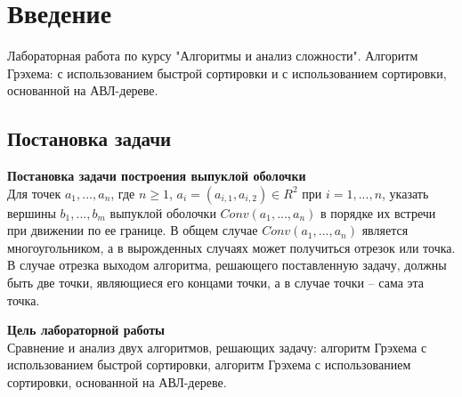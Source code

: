 \section{Введение}
Лабораторная работа по курсу "Алгоритмы и анализ сложности". Алгоритм Грэхема: с использованием быстрой сортировки и с использованием сортировки, основанной на АВЛ-дереве.

\subsection{Постановка задачи}

\noindent \textbf{Постановка задачи построения выпуклой оболочки}\\
\indent Для точек $a_1, ..., a_n$, где $n\geq1$, $a_i=(a_{i,1},a_{i,2})\in R^2$ при $i=1,...,n$, указать вершины $b_1,...,b_m$ выпуклой оболочки $Conv(a_1,...,a_n)$ в порядке их встречи при движении по ее границе. В общем случае $Conv(a_1,...,a_n)$ является многоугольником, а в вырожденных случаях может получиться отрезок или точка. В случае отрезка выходом алгоритма, решающего поставленную задачу, должны быть две точки, являющиеся его концами точки, а в случае точки -- сама эта точка.

\noindent \textbf{Цель лабораторной работы}\\
\indent Сравнение и анализ двух алгоритмов, решающих задачу: алгоритм Грэхема с использованием быстрой сортировки, алгоритм Грэхема с использованием сортировки, основанной на АВЛ-дереве.

